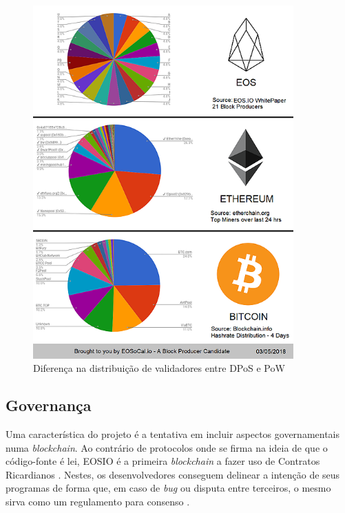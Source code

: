 \documentclass[a4paper,12pt]{monografia}
\theoremstyle{plain}
\theoremstyle{definition}
\theoremstyle{remark}
\begin{document}
\begin{figure}[ht]
 \begin{center}
   \includegraphics[width=100mm,scale=0.7]{./figs/eos-bp-distribution.png}
   \caption{Diferen\c{c}a na distribui\c{c}\~ao de validadores entre DPoS e PoW\footnotemark}
   \label{fig:eosbp}
 \end{center}
\end{figure}


\subsection{Governan\c{c}a}
Uma caracter\'istica do projeto \'e a tentativa em incluir aspectos governamentais numa \textit{blockchain}.
Ao contr\'ario de protocolos onde se firma na ideia de que o c\'odigo-fonte \'e lei, EOSIO \'e a primeira \textit{blockchain} a fazer uso de Contratos Ricardianos \cite{ricardian}.
Nestes, os desenvolvedores conseguem delinear a inten\c{c}\~ao de seus programas de forma que, em caso de \textit{bug} ou disputa entre terceiros, o mesmo sirva como um regulamento para consenso \cite{intentofcode}.
\end{document}
